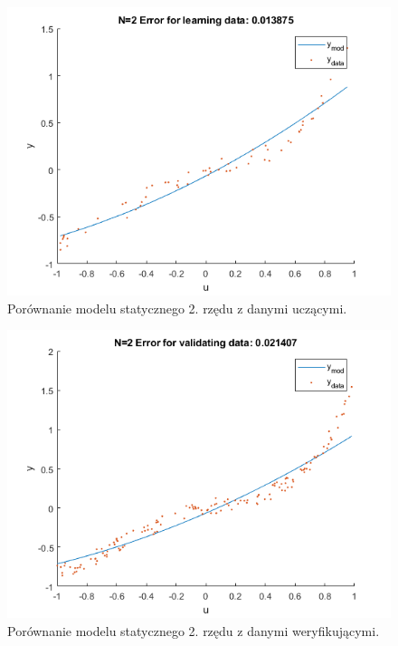\begin{figure}[H]
\centering
\includegraphics[width=15cm]{images/s3.png}
\caption{Porównanie modelu statycznego 2. rzędu z danymi uczącymi.}
\label{fig:s3}
\end{figure}
\begin{figure}[H]
\centering
\includegraphics[width=15cm]{images/s4.png}
\caption{Porównanie modelu statycznego 2. rzędu z danymi weryfikującymi.}
\label{fig:s4}
\end{figure}
